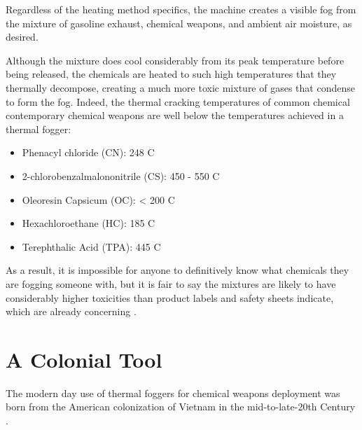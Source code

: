 \documentclass[
  11pt,
  titlepage]{krantz}
\providecommand{\tightlist}{%
  \setlength{\itemsep}{0pt}\setlength{\parskip}{0pt}}
\begin{document}
Regardless of the heating method specifics, the machine creates a visible fog from the mixture of gasoline exhaust, chemical weapons, and ambient air moisture, as desired.

Although the mixture does cool considerably from its peak temperature before being released, the chemicals are heated to such high temperatures that they thermally decompose, creating a much more toxic mixture of gases that condense to form the fog.
Indeed, the thermal cracking temperatures of common chemical contemporary chemical weapons are well below the temperatures achieved in a thermal fogger:

\begin{itemize}
\tightlist
\item
  Phenacyl chloride (CN): 248 C \citep{Compton1987}
\item
  2-chlorobenzalmalononitrile (CS): 450 - 550 C \citep{Xueetal2015}
\item
  Oleoresin Capsicum (OC): \textless{} 200 C \citep{HendersonandHenderson1992}
\item
  Hexachloroethane (HC): 185 C \citep{IARC1979}
\item
  Terephthalic Acid (TPA): 445 C \citep{KimyonokandUluturk2016}
\end{itemize}

As a result, it is impossible for anyone to definitively know what chemicals they are fogging someone with, but it is fair to say the mixtures are likely to have considerably higher toxicities than product labels and safety sheets indicate, which are already concerning \citep{defteccs}.

\hypertarget{Vietnam}{%
\chapter*{A Colonial Tool}\label{Vietnam}}


The modern day use of thermal foggers for chemical weapons deployment was born from the American colonization of Vietnam in the mid-to-late-20th Century \citep{USMACV1965, Bunker1996}.
\end{document}
